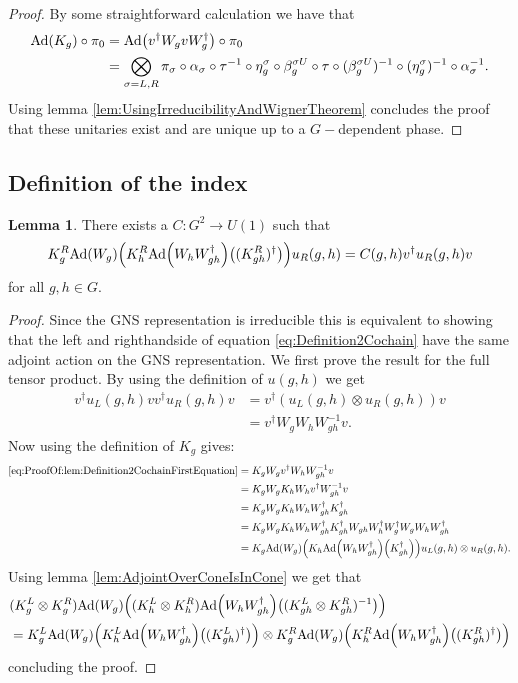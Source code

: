\documentclass[12pt,a4paper,twoside]{article}
\let\originalleft\left
\let\originalright\right
\renewcommand{\left}{\mathopen{}\mathclose\bgroup\originalleft}
\renewcommand{\right}{\aftergroup\egroup\originalright}
\newcommand{\Ad}[1]{\textrm{Ad}\left(#1\right)}
\theoremstyle{definition}
\newtheorem{lemma}[theorem]{Lemma}
\numberwithin{equation}{section}
\begin{document}
\begin{proof}
	By some straightforward calculation we have that
	\begin{align}
		\Ad{K_g}\circ\pi_0&=\Ad{v^\dagger W_g v W_g^\dagger}\circ\pi_0\\
		&=\bigotimes_{\sigma=L,R}\pi_\sigma\circ\alpha_\sigma\circ\tau^{-1}\circ \eta_g^\sigma\circ\beta_g^{\sigma U}\circ\tau\circ(\beta_g^{\sigma U})^{-1}\circ(\eta_g^{\sigma})^{-1}\circ\alpha_\sigma^{-1}.
	\end{align}
	Using lemma \ref{lem:UsingIrreducibilityAndWignerTheorem} concludes the proof that these unitaries exist and are unique up to a $G-$dependent phase.
\end{proof}
\subsection{Definition of the index}
\begin{lemma}\label{lem:Definition2Cochain}
	There exists a $C:G^2\rightarrow U(1)$ such that 
	\begin{equation}\label{eq:Definition2Cochain}
		K_g^R\Ad{W_g}\left(K_h^R\Ad{W_hW_{gh}^\dagger}\left((K_{gh}^R)^\dagger\right)\right)u_
		R(g,h)=C(g,h)v^\dagger u_R(g,h)v
	\end{equation}
	for all $g,h\in G.$
\end{lemma}
\begin{proof}
	Since the GNS representation is irreducible this is equivalent to showing that the left and righthandside of equation \eqref{eq:Definition2Cochain} have the same adjoint action on the GNS representation. We first prove the result for the full tensor product. By using the definition of $u(g,h)$ we get
	\begin{align}\label{eq:ProofOf:lem:Definition2CochainFirstEquation}
		v^\dagger u_L(g,h)v v^\dagger u_R(g,h) v&=v^\dagger (u_L(g,h)\otimes u_R(g,h)) v\\
		&=v^\dagger W_g W_h W_{gh}^{-1}v.
	\end{align}
	Now using the definition of $K_g$ gives:
	\begin{align}
		\eqref{eq:ProofOf:lem:Definition2CochainFirstEquation}&=K_gW_g v^\dagger W_h W_{gh}^{-1}v\\
		&=K_gW_g K_h W_h v^\dagger W_{gh}^{-1}v\\
		&=K_gW_g K_h W_h W_{gh}^\dagger K_{gh}^\dagger\\
		&=K_gW_g K_h W_h W_{gh}^\dagger K_{gh}^\dagger W_{gh}W_h^\dagger W_g^\dagger W_gW_hW_{gh}^\dagger\\
		&=K_g\Ad{W_g}\left(K_h\Ad{W_hW_{gh}^\dagger}\left(K_{gh}^\dagger\right)\right)u_L(g,h)\otimes u_
			R(g,h).
	\end{align}
	Using lemma \ref{lem:AdjointOverConeIsInCone} we get that
	\begin{align}
		&(K_g^L\otimes K_g^R)\Ad{W_g}\left((K_h^L\otimes K_h^R)\Ad{W_hW_{gh}^\dagger}\left((K_{gh}^L\otimes K_{gh}^R)^{-1}\right)\right)\\
		&=K_g^L\Ad{W_g}\left(K_h^L\Ad{W_hW_{gh}^\dagger}\left((K_{gh}^L)^\dagger\right)\right)\otimes K_g^R\Ad{W_g}\left(K_h^R\Ad{W_hW_{gh}^\dagger}\left((K_{gh}^R)^\dagger\right)\right)
	\end{align}
	concluding the proof.
\end{proof}
\end{document}
